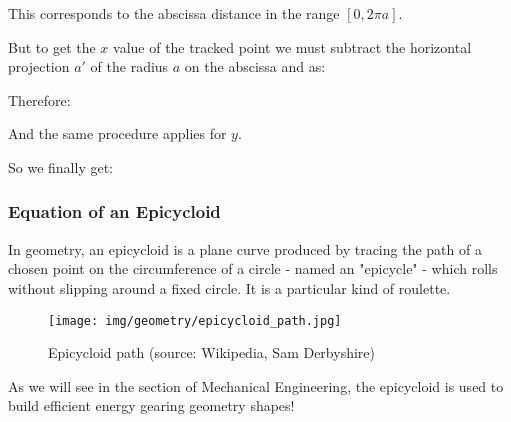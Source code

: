 	This corresponds to the abscissa distance in the range $[0,2\pi a]$.
	
	But to get the $x$  value of the tracked point we must subtract the horizontal projection $a'$ of the radius $a$ on the abscissa and as:
	
	Therefore:
	
	And the same procedure applies for $y$.

	So we finally get:
	
	
	\subsubsection{Equation of an Epicycloid}
	In geometry, an epicycloid is a plane curve produced by tracing the path of a chosen point on the circumference of a circle - named an "epicycle" - which rolls without slipping around a fixed circle. It is a particular kind of roulette.
	\begin{figure}[H]
		\centering
		\texttt{[image: img/geometry/epicycloid\_path.jpg]}
		\caption{Epicycloid path (source: Wikipedia, Sam Derbyshire)}
	\end{figure}
	As we will see in the section of Mechanical Engineering, the epicycloid is used to build efficient energy gearing geometry shapes!
	
